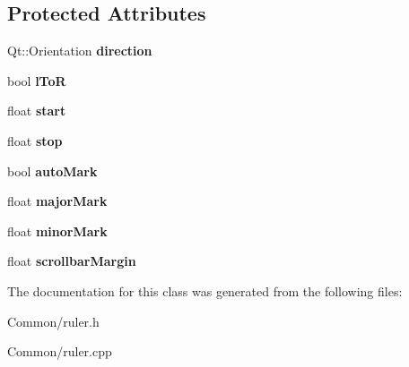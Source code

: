 \subsection*{\-Protected \-Attributes}
\begin{DoxyCompactItemize}
\item 
\hypertarget{class_ruler_a7f0afbaffe8d4a0969cff2f5b1ac884f}{
\-Qt\-::\-Orientation {\bfseries direction}}
\label{class_ruler_a7f0afbaffe8d4a0969cff2f5b1ac884f}

\item 
\hypertarget{class_ruler_a36bb43aa16a37436c9c0e7f1c37aeb16}{
bool {\bfseries l\-To\-R}}
\label{class_ruler_a36bb43aa16a37436c9c0e7f1c37aeb16}

\item 
\hypertarget{class_ruler_a58e402bd725ba7651dd3ea8120c59d97}{
float {\bfseries start}}
\label{class_ruler_a58e402bd725ba7651dd3ea8120c59d97}

\item 
\hypertarget{class_ruler_afda7831233ddc6cb4b2f0aa80d6d4577}{
float {\bfseries stop}}
\label{class_ruler_afda7831233ddc6cb4b2f0aa80d6d4577}

\item 
\hypertarget{class_ruler_a9bb0036b1f10dd643ffaf15508126b8f}{
bool {\bfseries auto\-Mark}}
\label{class_ruler_a9bb0036b1f10dd643ffaf15508126b8f}

\item 
\hypertarget{class_ruler_a4ca2f9dd5f6ac82d868aa3e258764a83}{
float {\bfseries major\-Mark}}
\label{class_ruler_a4ca2f9dd5f6ac82d868aa3e258764a83}

\item 
\hypertarget{class_ruler_ac1b7ec1ab60e8bcc63d2f611cfdd1b0c}{
float {\bfseries minor\-Mark}}
\label{class_ruler_ac1b7ec1ab60e8bcc63d2f611cfdd1b0c}

\item 
\hypertarget{class_ruler_ac1bbc36cc10d759ce82ff35e621f8348}{
float {\bfseries scrollbar\-Margin}}
\label{class_ruler_ac1bbc36cc10d759ce82ff35e621f8348}

\end{DoxyCompactItemize}


\-The documentation for this class was generated from the following files\-:\begin{DoxyCompactItemize}
\item 
\-Common/ruler.\-h\item 
\-Common/ruler.\-cpp\end{DoxyCompactItemize}
